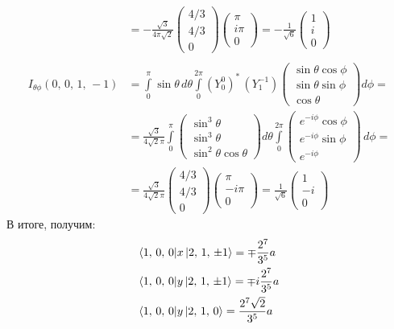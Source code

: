 \begin{align*}
    & = -\frac{\sqrt{3}}{4\pi\sqrt{2}}\begin{pmatrix} 4/3 \\  4/3 \\ 0 \end{pmatrix} \begin{pmatrix} \pi \\ i\pi \\ 0 \end{pmatrix} = -\frac{1}{\sqrt{6}}\begin{pmatrix} 1 \\  i \\ 0 \end{pmatrix} \\
    \\
    I_{\theta\phi}(0,\,0,\,1,\,-1) &= \int\limits_{0}^{\pi}\sin\theta\,d\theta\int\limits_{0}^{2\pi}(Y^0_0)^* \, (Y^{-1}_1) \begin{pmatrix} \sin\theta\cos\phi \\ \sin\theta\sin\phi \\ \cos\theta \end{pmatrix} d\phi = \\& = \frac{\sqrt{3}}{4\sqrt{2}\pi} \int\limits_0^{\pi} \begin{pmatrix} \sin^3 \theta \\ \sin^3\theta \\ \sin^2\theta\cos\theta \end{pmatrix} d\theta \int\limits_{0}^{2\pi} \begin{pmatrix} e^{-i\phi}\cos\phi \\ e^{-i\phi}\sin\phi \\ e^{-i\phi} \end{pmatrix} \, d\phi = \\& = \frac{\sqrt{3}}{4\sqrt{2}\pi} \begin{pmatrix} 4/3 \\ 4/3 \\ 0 \end{pmatrix} \begin{pmatrix} \pi \\ -i\pi \\ 0 \end{pmatrix} = \frac{1}{\sqrt{6}} \begin{pmatrix} 1 \\ -i \\ 0 \end{pmatrix}
\end{align*}
В итоге, получим:
\begin{align*}
 \bra{1,\, 0,\, 0}&x\ket{2,\, 1,\, \pm 1} = \mp \frac{2^7}{3^5}a\\
 \bra{1,\, 0,\, 0}&y\ket{2,\, 1,\, \pm 1} = \mp i\frac{2^7}{3^5}a\\
 \bra{1,\, 0,\, 0}&y\ket{2,\, 1,\,  0} = \frac{2^7 \sqrt{2}}{3^5}a
\end{align*}
